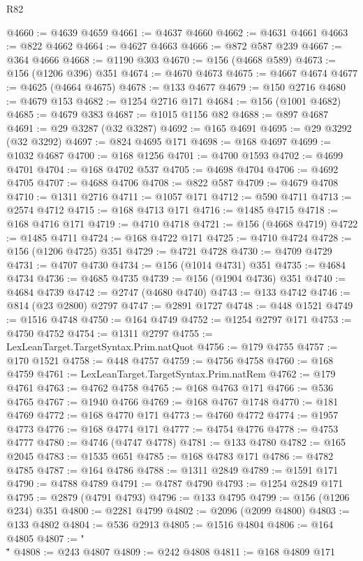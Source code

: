 \begin{lexlean}{R82}
\begin{coremodule}
@4660 := @4639 @4659
@4661 := @4637 @4660
@4662 := @4631 @4661
@4663 := @822 @4662
@4664 := @4627 @4663
@4666 := @872 @587 @239
@4667 := @364 @4666
@4668 := @1190 @303
@4670 := @156 (@4668 @589)
@4673 := @156 (@1206 @396) @351
@4674 := @4670 @4673
@4675 := @4667 @4674
@4677 := @4625 (@4664 @4675)
@4678 := @133 @4677
@4679 := @150 @2716
@4680 := @4679 @153
@4682 := @1254 @2716 @171
@4684 := @156 (@1001 @4682)
@4685 := @4679 @383
@4687 := @1015 @1156 @82
@4688 := @897 @4687
@4691 := @29 @3287 (@32 @3287)
@4692 := @165 @4691
@4695 := @29 @3292 (@32 @3292)
@4697 := @824 @4695 @171
@4698 := @168 @4697
@4699 := @1032 @4687
@4700 := @168 @1256
@4701 := @4700 @1593
@4702 := @4699 @4701
@4704 := @168 @4702 @537
@4705 := @4698 @4704
@4706 := @4692 @4705
@4707 := @4688 @4706
@4708 := @822 @587
@4709 := @4679 @4708
@4710 := @1311 @2716
@4711 := @1057 @171
@4712 := @590 @4711
@4713 := @2574 @4712
@4715 := @168 @4713 @171
@4716 := @1485 @4715
@4718 := @168 @4716 @171
@4719 := @4710 @4718
@4721 := @156 (@4668 @4719)
@4722 := @1485 @4711
@4724 := @168 @4722 @171
@4725 := @4710 @4724
@4728 := @156 (@1206 @4725) @351
@4729 := @4721 @4728
@4730 := @4709 @4729
@4731 := @4707 @4730
@4734 := @156 (@1014 @4731) @351
@4735 := @4684 @4734
@4736 := @4685 @4735
@4739 := @156 (@1904 @4736) @351
@4740 := @4684 @4739
@4742 := @2747 (@4680 @4740)
@4743 := @133 @4742
@4746 := @814 (@23 @2800) @2797
@4747 := @2891 @1727
@4748 := @448 @1521
@4749 := @1516 @4748
@4750 := @164 @4749
@4752 := @1254 @2797 @171
@4753 := @4750 @4752
@4754 := @1311 @2797
@4755 := LexLeanTarget.TargetSyntax.Prim.natQuot
@4756 := @179 @4755
@4757 := @170 @1521
@4758 := @448 @4757
@4759 := @4756 @4758
@4760 := @168 @4759
@4761 := LexLeanTarget.TargetSyntax.Prim.natRem
@4762 := @179 @4761
@4763 := @4762 @4758
@4765 := @168 @4763 @171
@4766 := @536 @4765
@4767 := @1940 @4766
@4769 := @168 @4767 @1748
@4770 := @181 @4769
@4772 := @168 @4770 @171
@4773 := @4760 @4772
@4774 := @1957 @4773
@4776 := @168 @4774 @171
@4777 := @4754 @4776
@4778 := @4753 @4777
@4780 := @4746 (@4747 @4778)
@4781 := @133 @4780
@4782 := @165 @2045
@4783 := @1535 @651
@4785 := @168 @4783 @171
@4786 := @4782 @4785
@4787 := @164 @4786
@4788 := @1311 @2849
@4789 := @1591 @171
@4790 := @4788 @4789
@4791 := @4787 @4790
@4793 := @1254 @2849 @171
@4795 := @2879 (@4791 @4793)
@4796 := @133 @4795
@4799 := @156 (@1206 @234) @351
@4800 := @2281 @4799
@4802 := @2096 (@2099 @4800)
@4803 := @133 @4802
@4804 := @536 @2913
@4805 := @1516 @4804
@4806 := @164 @4805
@4807 := "\\\""
@4808 := @243 @4807
@4809 := @242 @4808
@4811 := @168 @4809 @171

\end{coremodule}
\end{lexlean}
